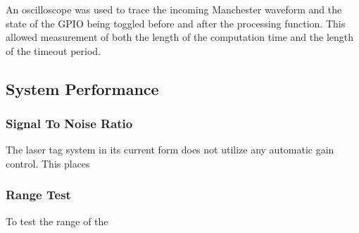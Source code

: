 An oscilloscope was used to trace the incoming Manchester waveform and the state of the GPIO being toggled before and after the processing function. This allowed measurement of both the length of the computation time and the length of the timeout period.




\subsection{System Performance}

\subsubsection{Signal To Noise Ratio}
The laser tag system in its current form does not utilize any automatic gain control. This places


\subsubsection{Range Test}


To test the range of the 